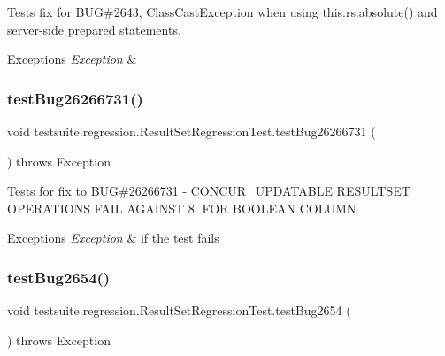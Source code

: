 Tests fix for B\+UG\#2643, Class\+Cast\+Exception when using this.\+rs.\+absolute() and server-\/side prepared statements.


\begin{DoxyExceptions}{Exceptions}
{\em Exception} & \\
\hline
\end{DoxyExceptions}
\mbox{\label{classtestsuite_1_1regression_1_1_result_set_regression_test_abdf1a89f884b877e115ff10663abd11a}} 
\subsubsection{\texorpdfstring{test\+Bug26266731()}{testBug26266731()}}
{\footnotesize\ttfamily void testsuite.\+regression.\+Result\+Set\+Regression\+Test.\+test\+Bug26266731 (\begin{DoxyParamCaption}{ }\end{DoxyParamCaption}) throws Exception}

Tests for fix to B\+UG\#26266731 -\/ C\+O\+N\+C\+U\+R\+\_\+\+U\+P\+D\+A\+T\+A\+B\+LE R\+E\+S\+U\+L\+T\+S\+ET O\+P\+E\+R\+A\+T\+I\+O\+NS F\+A\+IL A\+G\+A\+I\+N\+ST 8. F\+OR B\+O\+O\+L\+E\+AN C\+O\+L\+U\+MN


\begin{DoxyExceptions}{Exceptions}
{\em Exception} & if the test fails \\
\hline
\end{DoxyExceptions}
\mbox{\label{classtestsuite_1_1regression_1_1_result_set_regression_test_a32ba87707ddb894483b0813570ec5571}} 
\subsubsection{\texorpdfstring{test\+Bug2654()}{testBug2654()}}
{\footnotesize\ttfamily void testsuite.\+regression.\+Result\+Set\+Regression\+Test.\+test\+Bug2654 (\begin{DoxyParamCaption}{ }\end{DoxyParamCaption}) throws Exception}

